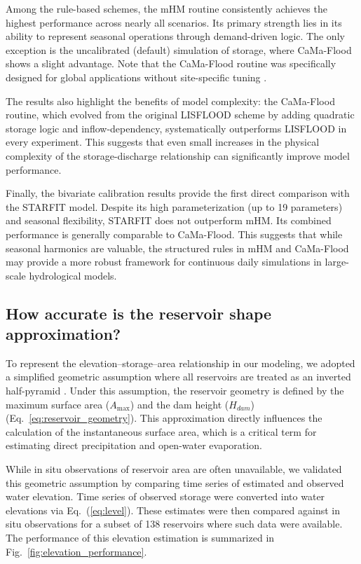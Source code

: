 \documentclass[hess, manuscript]{copernicus}
\begin{document}
Among the rule-based schemes, the mHM routine consistently achieves the highest performance across nearly all scenarios. Its primary strength lies in its ability to represent seasonal operations through demand-driven logic. The only exception is the uncalibrated (default) simulation of storage, where CaMa-Flood shows a slight advantage. Note that the CaMa-Flood routine was specifically designed for global applications without site-specific tuning \citep{Hanazaki2022}.

The results also highlight the benefits of model complexity: the CaMa-Flood routine, which evolved from the original LISFLOOD scheme by adding quadratic storage logic and inflow-dependency, systematically outperforms LISFLOOD in every experiment. This suggests that even small increases in the physical complexity of the storage-discharge relationship can significantly improve model performance.

Finally, the bivariate calibration results provide the first direct comparison with the STARFIT model. Despite its high parameterization (up to 19 parameters) and seasonal flexibility, STARFIT does not outperform mHM. Its combined performance is generally comparable to CaMa-Flood. This suggests that while seasonal harmonics are valuable, the structured rules in mHM and CaMa-Flood may provide a more robust framework for continuous daily simulations in large-scale hydrological models.

\subsection{How accurate is the reservoir shape approximation?}
\label{sec:reservoir_shape}

To represent the elevation–storage–area relationship in our modeling, we adopted a simplified geometric assumption where all reservoirs are treated as an inverted half-pyramid \citep{Liebe2005}. Under this assumption, the reservoir geometry is defined by the maximum surface area ($A_{\max}$) and the dam height ($H_{dam}$) (Eq.~\ref{eq:reservoir_geometry}). This approximation directly influences the calculation of the instantaneous surface area, which is a critical term for estimating direct precipitation and open-water evaporation.

While in situ observations of reservoir area are often unavailable, we validated this geometric assumption by comparing time series of estimated and observed water elevation. Time series of observed storage were converted into water elevations via Eq.~(\ref{eq:level}). These estimates were then compared against in situ observations for a subset of 138 reservoirs where such data were available. The performance of this elevation estimation is summarized in Fig.~\ref{fig:elevation_performance}.
\end{document}
